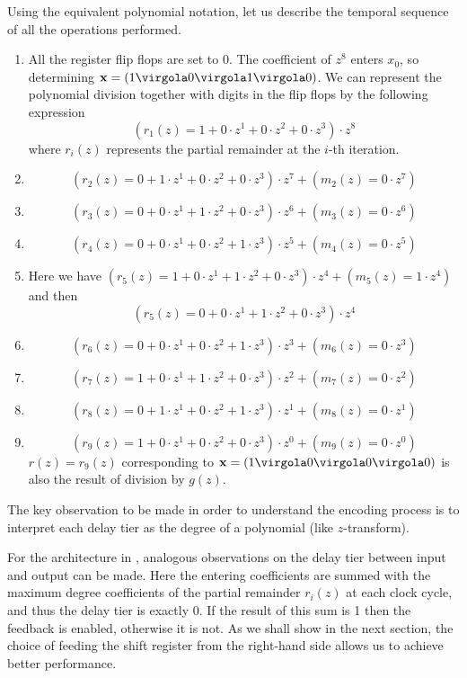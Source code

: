 Using the equivalent polynomial notation, let us describe the temporal sequence of all the operations performed.
\begin{enumerate}
\item All the register flip flops are set to 0. The coefficient of \(z^8\) enters \(x_0\), so determining \(\vet x =  (1\virgola0\virgola1\virgola0)\). We can represent the polynomial division together with digits in the flip flops by the following expression
    \[ (r_{1}(z)=1+0\cdot z^1+0\cdot z^2+0\cdot z^3)\cdot z^8\]
    where \(r_{i}(z)\) represents the partial remainder at the \(i\)-th iteration.

\item \[(r_{2}(z)=0+1\cdot z^1+0\cdot z^2+0\cdot z^3)\cdot z^7 + (m_2(z) = 0\cdot z^7)\]
\item \[(r_{3}(z)=0+0\cdot z^1+1\cdot z^2+0\cdot z^3)\cdot z^6 + (m_3(z) = 0\cdot z^6)\]
\item \[(r_{4}(z)=0+0\cdot z^1+0\cdot z^2+1\cdot z^3)\cdot z^5 + (m_4(z) = 0\cdot z^5)\]
\item Here we have \((r_{5}(z)=1+0\cdot z^1+1\cdot z^2+0\cdot z^3)\cdot z^4 + (m_5(z) = 1\cdot z^4)\) and then
    \[
    (r_{5}(z)=0+0\cdot z^1+1\cdot z^2+0\cdot z^3)\cdot z^4
    \]
\item
\[(r_{6}(z)=0+0\cdot z^1+0\cdot z^2+1\cdot z^3)\cdot z^3 + (m_6(z) = 0\cdot z^3)\]
\item
\[(r_{7}(z)=1+0\cdot z^1+1\cdot z^2+0\cdot z^3)\cdot z^2+ (m_7(z) = 0\cdot z^2)\]
\item
\[(r_{8}(z)=0+1\cdot z^1+0\cdot z^2+1\cdot z^3)\cdot z^1+ (m_8(z) = 0\cdot z^1)\]
\item
\[(r_{9}(z)=1+0\cdot z^1+0\cdot z^2+0\cdot z^3)\cdot z^0+ (m_9(z) = 0\cdot z^0)\]
\(r(z)=r_9(z)\) corresponding to \(\vet x=(1\virgola0\virgola0\virgola0)\) is also the result of division by \(g(z)\).
\end{enumerate}
The key observation to be made in order to understand the encoding process is to interpret each delay tier as the degree of a polynomial (like \(z\)-transform).

For the architecture in , analogous observations on the delay tier between input and output can be made. Here the entering coefficients are summed with the maximum degree coefficients of the partial remainder \(r_{i}(z)\) at each clock cycle, and thus the delay tier is exactly 0. If the result of this sum is 1 then the feedback is enabled, otherwise it is not. As we shall show in the next section, the choice of feeding the shift register from the right-hand side allows us to achieve better performance.

